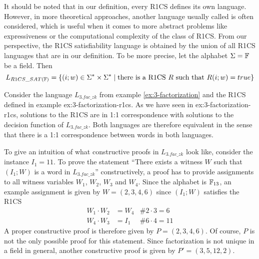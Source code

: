 \begin{remark}[R1CS satisfiability]\label{r1cs-satisfiability} It should be noted that in our definition, every R1CS defines its own language. However,  in more theoretical approaches, another language usually called  is often considered, which is useful when it comes to more abstract problems like expressiveness or the computational complexity of the class of  R1CS. From our perspective, the R1CS satisfiability language is obtained by the union of all R1CS languages that are in our definition. To be more precise, let the alphabet $\Sigma=\mathbb{F}$ be a field. Then 
$$
L_{R1CS\_SAT(\mathbb{F})} = \{(i;w)\in \Sigma^*\times \Sigma^*\;|\; \text{there is a R1CS $R$ such that } R(i;w)=true  \}
$$
\end{remark}
\begin{example}[3-Factorization]Consider the language $L_{3.fac\_zk}$ from example \ref{ex:3-factorization} and the R1CS defined in example {ex:3-factorization-r1cs}. As we have seen in {ex:3-factorization-r1cs}, solutions to the R1CS are in 1:1 correspondence with solutions to the decision function of $L_{3.fac\_zk}$. Both languages are therefore equivalent in the sense that there is a 1:1 correspondence between words in both languages.

To give an intuition of what constructive proofs in $L_{3.fac\_zk}$ look like, consider the instance $I_1= 11$. To prove the statement ``There exists a witness $W$ such that $(I_1;W)$ is a word in $L_{3.fac\_zk}$'' constructively, a proof has to provide assignments to all witness variables $W_1$, $W_2$, $W_3$ and $W_4$. Since the alphabet is $\mathbb{F}_{13}$, an example assignment is given by
$W=(2,3,4,6)$ since $(I_1;W)$ satisfies the R1CS
\begin{align*}
W_1 \cdot W_2 &= W_4 & \text{\# } 2\cdot 3 = 6\\
W_4 \cdot W_3 &= I_1 & \text{\# } 6\cdot 4 = 11
\end{align*}
A proper constructive proof is therefore given by $P=(2,3,4,6)$. Of course, $P$ is not the only possible proof for this statement. Since factorization is not unique in a field in general, another constructive proof is given by $P'=(3,5,12,2)$. 
\end{example}
